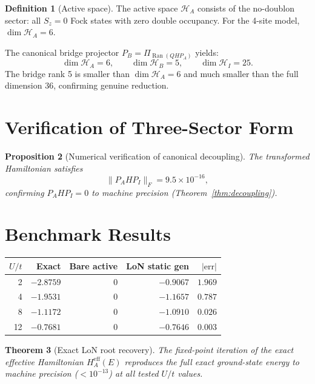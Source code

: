 \documentclass[12pt]{article}
\theoremstyle{plain}
\newtheorem{theorem}{Theorem}[section]
\newtheorem{proposition}[theorem]{Proposition}
\theoremstyle{definition}
\newtheorem{definition}[theorem]{Definition}
\numberwithin{equation}{section}
\newcommand{\eff}{\mathrm{eff}}
\DeclareMathOperator{\Ran}{Ran}
\begin{document}
\begin{definition}[Active space]\label{def:hubbardactive}
The active space $\mathcal{H}_A$ consists of the no-doublon
sector: all $S_z=0$ Fock states with zero double occupancy.
For the 4-site model, $\dim\mathcal{H}_A=6$.
\end{definition}

The canonical bridge projector
$P_B=\Pi_{\Ran(QHP_A)}$ yields:
\begin{equation}
\dim\mathcal{H}_A=6,\qquad
\dim\mathcal{H}_B=5,\qquad
\dim\mathcal{H}_I=25.
\end{equation}
The bridge rank 5 is smaller than $\dim\mathcal{H}_A=6$ and much
smaller than the full dimension 36, confirming genuine reduction.

\section{Verification of Three-Sector Form}\label{sec:verify}

\begin{proposition}[Numerical verification of canonical decoupling]\label{prop:numerical}
The transformed Hamiltonian satisfies
\begin{equation}
\|P_AHP_I\|_F = 9.5\times 10^{-16},
\end{equation}
confirming $P_AHP_I=0$ to machine precision
(Theorem~\ref{thm:decoupling}).
\end{proposition}

\section{Benchmark Results}\label{sec:results}

\begin{center}
\begin{tabular}{rrrrr}
\toprule
$U/t$ & Exact & Bare active & LoN static gen & $|\mathrm{err}|$\\
\midrule
2 & $-2.8759$ & $0$ & $-0.9067$ & $1.969$\\
4 & $-1.9531$ & $0$ & $-1.1657$ & $0.787$\\
8 & $-1.1172$ & $0$ & $-1.0910$ & $0.026$\\
12 & $-0.7681$ & $0$ & $-0.7646$ & $0.003$\\
\bottomrule
\end{tabular}
\end{center}

\begin{theorem}[Exact LoN root recovery]\label{thm:recovery}
The fixed-point iteration of the exact effective Hamiltonian
$H_A^{\eff}(E)$ reproduces the full exact ground-state energy to
machine precision ($<10^{-13}$) at all tested $U/t$ values.
\end{theorem}
\end{document}
